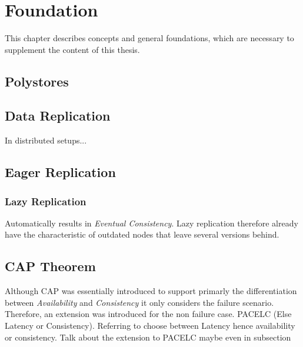 \chapter{Foundation}
\label{c:Foundation}

This chapter describes concepts and general foundations, which are necessary to supplement 
the content of this thesis. 

\section{Polystores}


\section{Data Replication}
In distributed setups...

\section{Eager Replication}

\subsection{Lazy Replication}
Automatically results in \emph{Eventual Consistency}. Lazy replication therefore already have the characteristic of outdated nodes that leave several versions behind.


\section{CAP Theorem}

Although CAP was essentially introduced to support primarly the differentiation between \emph{Availability} and \emph{Consistency} it only considers the failure scenario.
Therefore, an extension was introduced for the non failure case.
PACELC (Else Latency or Consistency). Referring to choose between Latency hence availability or consistency. 
Talk about the extension to PACELC maybe even in subsection

